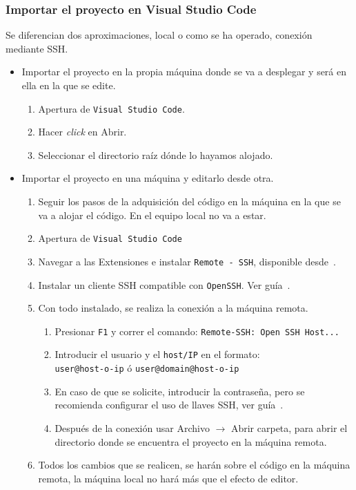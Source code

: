 \subsubsection{Importar el proyecto en Visual Studio Code}
Se diferencian dos aproximaciones, local o como se ha operado, conexión mediante SSH.

\begin{itemize}
\item Importar el proyecto en la propia máquina donde se va a desplegar y será en ella en la que se edite.
\begin{enumerate}
\item Apertura de \texttt{Visual Studio Code}.
\item Hacer \textit{click} en Abrir.
\item Seleccionar el directorio raíz dónde lo hayamos alojado.
\end{enumerate}
\item Importar el proyecto en una máquina y editarlo desde otra.
\begin{enumerate}
\item Seguir los pasos de la adquisición del código en la máquina en la que se va a alojar el código. En el equipo local no va a estar.
\item Apertura de \texttt{Visual Studio Code}
\item Navegar a las Extensiones e instalar \texttt{Remote - SSH}, disponible desde~\cite{VSCode-Remote-SSH}.
\item Instalar un cliente SSH compatible con \texttt{OpenSSH}. Ver guía~\cite{Remote-Development-Tricks-Tips}.
\item Con todo instalado, se realiza la conexión a la máquina remota.
\begin{enumerate}
\item Presionar \texttt{F1} y correr el comando: \texttt{Remote-SSH: Open SSH Host...}
\item Introducir el usuario y el \texttt{host/IP} en el formato:\\
\texttt{user@host-o-ip} ó \texttt{user@domain@host-o-ip}
\item En caso de que se solicite, introducir la contraseña, pero se recomienda configurar el uso de llaves SSH, ver guía~\cite{Remote-Development-Tricks-Tips}.
\item Después de la conexión usar Archivo $\rightarrow$ Abrir carpeta, para abrir el directorio donde se encuentra el proyecto en la máquina remota.
\end{enumerate}
\item Todos los cambios que se realicen, se harán sobre el código en la máquina remota, la máquina local no hará más que el efecto de editor.
\end{enumerate}
\end{itemize}

